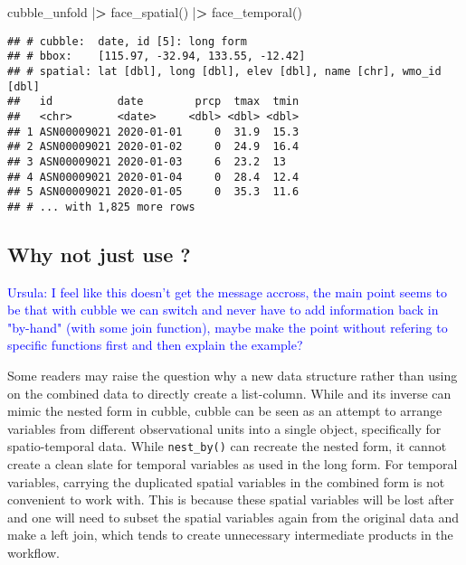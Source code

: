 \documentclass{article}
\newenvironment{Shaded}{\begin{snugshade}}{\end{snugshade}}
\newcommand{\ErrorTok}[1]{\textcolor[rgb]{0.64,0.00,0.00}{\textbf{#1}}}
\newcommand{\FunctionTok}[1]{\textcolor[rgb]{0.00,0.00,0.00}{#1}}
\newcommand{\NormalTok}[1]{#1}
\newcommand{\SpecialCharTok}[1]{\textcolor[rgb]{0.00,0.00,0.00}{#1}}
\begin{document}
\begin{Shaded}
\begin{Highlighting}[]
\NormalTok{cubble\_unfold }\SpecialCharTok{|}\ErrorTok{\textgreater{}} \FunctionTok{face\_spatial}\NormalTok{() }\SpecialCharTok{|}\ErrorTok{\textgreater{}} \FunctionTok{face\_temporal}\NormalTok{()}
\end{Highlighting}
\end{Shaded}

\begin{verbatim}
## # cubble:  date, id [5]: long form
## # bbox:    [115.97, -32.94, 133.55, -12.42]
## # spatial: lat [dbl], long [dbl], elev [dbl], name [chr], wmo_id [dbl]
##   id          date        prcp  tmax  tmin
##   <chr>       <date>     <dbl> <dbl> <dbl>
## 1 ASN00009021 2020-01-01     0  31.9  15.3
## 2 ASN00009021 2020-01-02     0  24.9  16.4
## 3 ASN00009021 2020-01-03     6  23.2  13  
## 4 ASN00009021 2020-01-04     0  28.4  12.4
## 5 ASN00009021 2020-01-05     0  35.3  11.6
## # ... with 1,825 more rows
\end{verbatim}

\subsection[Why not just use]{Why not just use ?}

\textcolor{blue}{Ursula: I feel like this doesn't get the message accross, the main point seems to be that with cubble we can switch and never have to add information back in "by-hand" (with some join function), maybe make the point without refering to specific functions first and then explain the example?}

Some readers may raise the question why a new data structure rather than using  on the combined data to directly create a list-column. While  and its inverse  can mimic the nested form in cubble, cubble can be seen as an attempt to arrange variables from different observational units into a single object, specifically for spatio-temporal data. While \texttt{nest\_by()} can recreate the nested form, it cannot create a clean slate for temporal variables as used in the long form. For temporal variables, carrying the duplicated spatial variables in the combined form is not convenient to work with. This is because these spatial variables will be lost after  and one will need to subset the spatial variables again from the original data and make a left join, which tends to create unnecessary intermediate products in the workflow.
\end{document}
